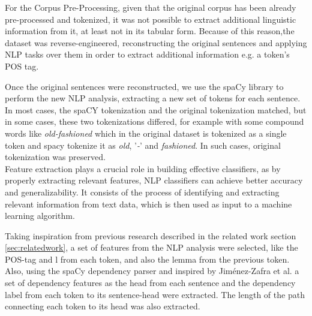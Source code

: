 For the Corpus Pre-Processing, given that the original corpus has been already pre-processed and tokenized, it was not possible to extract additional linguistic information from it, at least not in its tabular form. Because of this reason,the dataset was reverse-engineered, reconstructing the original sentences and applying NLP tasks over them in order to extract additional information e.g. a token's POS tag. 

Once the original sentences were reconstructed, we use the spaCy library to perform the new NLP analysis, extracting a new set of tokens for each sentence. In most cases, the spaCY tokenization and the original tokenization matched, but in some cases, these two tokenizations differed, for example with some compound words like \textit{old-fashioned} which in the original dataset is tokenized as a single token and spacy tokenize it as \textit{old}, '\textit{-}' and \textit{fashioned}. In such cases, original tokenization was preserved. 
\\

Feature extraction plays a crucial role in building effective classifiers, as by properly extracting relevant features, NLP classifiers can achieve better accuracy and generalizability. It consists of the process of identifying and extracting relevant information from text data, which is then used as input to a machine learning algorithm.

Taking inspiration from previous research described in the related work section \ref{sec:relatedwork}, a set of features from the NLP analysis were selected, like the POS-tag and l from each token, and also the lemma from the previous token. Also, using the spaCy dependency parser and inspired by Jiménez-Zafra et al. \cite{jimenez2020detecting} a set of dependency features as the head from each sentence and the dependency label from each token to its sentence-head were extracted. The length of the path connecting each token to its head was also extracted. 

